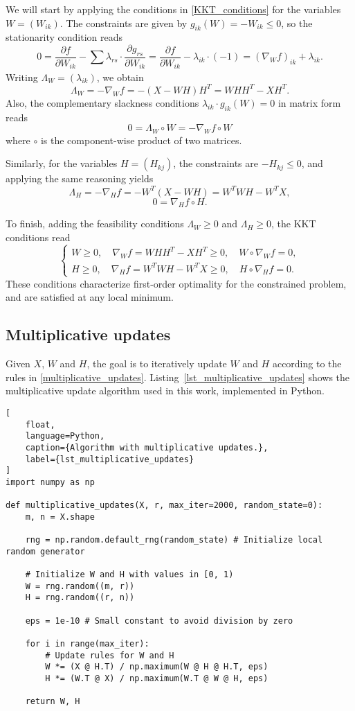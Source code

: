 \documentclass{amsart}
\begin{document}
We will start by applying the conditions in \eqref{KKT_conditions} for the variables $W=(W_{ik})$. The constraints are given by $g_{ik}(W)= -W_{ik}\leq 0$, so the stationarity condition reads
\[
    0= \frac{\partial f}{\partial W_{ik}} -\sum_{} \lambda_{rs}\cdot \frac{\partial g_{rs}}{\partial W_{ik}} = \frac{\partial f}{\partial W_{ik}} -\lambda_{ik}\cdot (-1)= \left(\nabla_W f\right)_{ik} +\lambda_{ik}.
\]
Writing $\Lambda_W=(\lambda_{ik})$, we obtain
\[
    \Lambda_W= -\nabla_W f= -(X-WH)H^T= WHH^T -XH^T.
\]
Also, the complementary slackness conditions $\lambda_{ik}\cdot g_{ik}(W)=0$ in matrix form reads
\[
    0= \Lambda_W\circ W= -\nabla_W f\circ W
\]
where $\circ$ is the component-wise product of two matrices.

Similarly, for the variables $H=(H_{kj})$, the constraints are $-H_{kj}\leq 0$, and applying the same reasoning yields
\[
    \Lambda_H= -\nabla_H f= -W^T(X-WH)= W^TWH -W^TX,
\]
\[
    0= \nabla_H f\circ H.
\]

To finish, adding the feasibility conditions $\Lambda_W\geq 0$ and $\Lambda_H\geq 0$, the KKT conditions read
\begin{equation}
    \label{first_order_optimality_conditions}
    \begin{cases}
        W \geq 0,\quad \nabla_W f = WHH^T - XH^T \geq 0,\quad W \circ \nabla_W f = 0, \\
        H \geq 0,\quad \nabla_H f = W^TWH - W^TX \geq 0,\quad H \circ \nabla_H f = 0.
    \end{cases}
\end{equation}
These conditions characterize first-order optimality for the constrained problem, and are satisfied at any local minimum.

\subsection{Multiplicative updates}

Given $X$, $W$ and $H$, the goal is to iteratively update $W$ and $H$ according to the rules in \eqref{multiplicative_updates}. Listing~\ref{lst_multiplicative_updates} shows the multiplicative update algorithm used in this work, implemented in Python.

\begin{lstlisting}[
    float,
    language=Python,
    caption={Algorithm with multiplicative updates.},
    label={lst_multiplicative_updates}
]
import numpy as np

def multiplicative_updates(X, r, max_iter=2000, random_state=0):
    m, n = X.shape

    rng = np.random.default_rng(random_state) # Initialize local random generator

    # Initialize W and H with values in [0, 1)
    W = rng.random((m, r))
    H = rng.random((r, n)) 
    
    eps = 1e-10 # Small constant to avoid division by zero

    for i in range(max_iter):
        # Update rules for W and H
        W *= (X @ H.T) / np.maximum(W @ H @ H.T, eps)
        H *= (W.T @ X) / np.maximum(W.T @ W @ H, eps)

    return W, H
\end{lstlisting}
\end{document}
